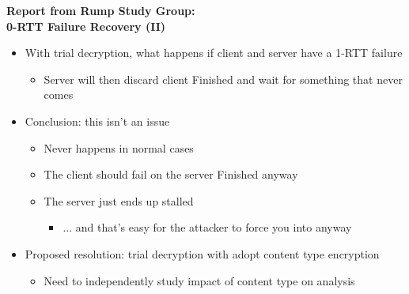 \documentclass[helvetica]{seminar}
\newcommand{\heading}[1]{%
  \begin{center} 
    \large\bf 
    #1 
  \end{center} 
  \vspace{.4 in}}
\begin{document}
\begin{slide}
\heading{Report from Rump Study Group:\\0-RTT Failure Recovery (II)}

\vspace{-5ex}
\begin{itemize}
\item With trial decryption, what happens if client and server have a 1-RTT failure
  \begin{itemize}
  \item Server will then discard client Finished and wait for something that never comes
  \end{itemize}

\item Conclusion: this isn't an issue
  \begin{itemize}
  \item Never happens in normal cases
  \item The client should fail on the server Finished anyway
  \item The server just ends up stalled
    \begin{itemize}
    \item ... and that's easy for the attacker to force you into anyway
    \end{itemize}
  \end{itemize}

\item Proposed resolution: trial decryption with adopt content type encryption
  \begin{itemize}
  \item Need to independently study impact of content type on analysis
  \end{itemize}
\end{itemize}
\end{slide}
\end{document}
